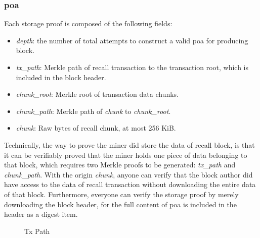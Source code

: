 \documentclass[]{article}
\begin{document}
\subsubsection{poa}\label{poa}

Each storage proof is composed of the following fields:

\begin{itemize}
    \item \textit{depth}: the number of total attempts to construct a valid poa for producing block.
    \item \textit{tx\_path}: Merkle path of recall transaction to the transaction root, which is included in the block header.
    \item \textit{chunk\_root}: Merkle root of transaction data chunks.
    \item \textit{chunk\_path}: Merkle path of \textit{chunk} to \textit{chunk\_root}.
    \item \textit{chunk}: Raw bytes of recall chunk, at most 256 KiB.
\end{itemize}

Technically, the way to prove the miner did store the data of recall block, is that it can be verifiably proved that the miner holds one piece of data belonging to that block, which requires two Merkle proofs to be generated: \textit{tx\_path} and \textit{chunk\_path}. With the origin \textit{chunk}, anyone can verify that the block author did have access to the data of recall transaction without downloading the entire data of that block. Furthermore, everyone can verify the storage proof by merely downloading the block header, for the full content of poa is included in the header as a digest item.

\begin{figure}
\caption{Tx Path}
\end{figure}
\end{document}
